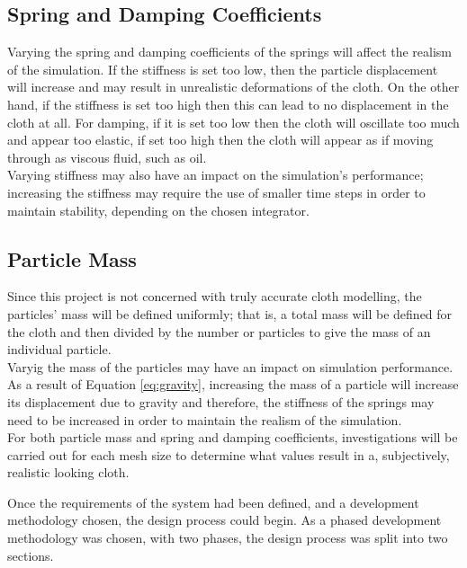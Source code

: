 \subsection{Spring and Damping Coefficients}
Varying the spring and damping coefficients of the springs will affect the realism of the simulation. If the stiffness is set too low, then the particle displacement will increase and may result in unrealistic deformations of the cloth. On the other hand, if the stiffness is set too high then this can lead to no displacement in the cloth at all. For damping, if it is set too low then the cloth will oscillate too much and appear too elastic, if set too high then the cloth will appear as if moving through as viscous fluid, such as oil.
\\Varying stiffness may also have an impact on the simulation's performance; increasing the stiffness may require the use of smaller time steps in order to maintain stability, depending on the chosen integrator.

\subsection{Particle Mass}
Since this project is not concerned with truly accurate cloth modelling, the particles' mass will be defined uniformly; that is, a total mass will be defined for the cloth and then divided by the number or particles to give the mass of an individual particle.
\\Varyig the mass of the particles may have an impact on simulation performance. As a result of Equation \ref{eq:gravity}, increasing the mass of a particle will increase its displacement due to gravity and therefore, the stiffness of the springs may need to be increased in order to maintain the realism of the simulation. 
\\For both particle mass and spring and damping coefficients, investigations will be carried out for each mesh size to determine what values result in a, subjectively, realistic looking cloth.

Once the requirements of the system had been defined, and a development methodology chosen, the design process could begin. As a phased development methodology was chosen, with two phases, the design process was split into two sections.

